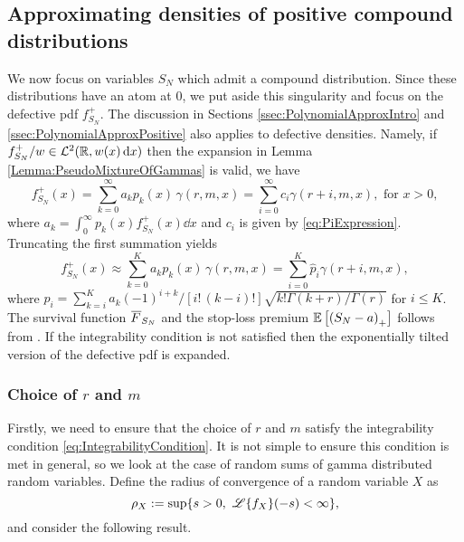 \subsection{Approximating densities of positive compound distributions}
We now focus on variables $S_N$ which admit a compound distribution. Since these distributions have an atom at 0, we put aside this singularity and focus on the defective pdf $f_{S_N}^+$. The discussion in Sections \ref{ssec:PolynomialApproxIntro} and \ref{ssec:PolynomialApproxPositive} also applies to defective densities. Namely, if $f_{S_N}^{+}/w\in \mathcal{L}^2(\mathbb{R}, w(x) \mathop{}\!\mathrm{d} x)$ then the expansion in Lemma \ref{Lemma:PseudoMixtureOfGammas} is valid, we have
\begin{equation*}\label{eq:PseudoErlangMixtureRepresentationDefectivePDF}
f_{S_N}^+(x)= \sum_{k=0}^\infty a_k p_k(x) \, \gamma(r, m, x) = \sum_{i=0}^{\infty} c_i \gamma(r+i,m,x),\text{ for }x>0,
\end{equation*}
where $a_k=\int_{0}^{\infty}p_{k}(x)f_{S_N}^+(x)\dd x$ and $c_i$ is given by \eqref{eq:PiExpression}.
Truncating the first summation yields
\begin{equation*}\label{eq:ApproxPolynomialRepresentation}
f_{S_N}^{+}(x)
\approx \sum_{k=0}^{K} a_k p_{k}(x) \, \gamma(r,m,x)
= \sum_{i=0}^{K} \widehat{p}_i\gamma(r+i,m,x),
\end{equation*}
where $\widehat{p}_i =\sum_{k=i}^K a_k (-1)^{i+k} / [i! \, (k-i)! ] \sqrt{k! \Gamma(k+r) / \Gamma(r)}$ for $i \le K$. The survival function $\Ftail_{S_N}$ and the stop-loss premium $\operatorname{{\mathbb E}}\left[\left(S_N-a\right)_{+}\right]$ follows from . If the integrability condition is not satisfied then the exponentially tilted version of the defective pdf is expanded.

\subsubsection{Choice of $r$ and $m$}\label{ssec:ChoosingmAndr}

Firstly, we need to ensure that the choice of $r$ and $m$ satisfy the integrability condition \eqref{eq:IntegrabilityCondition}. It is not simple to ensure this condition is met in general, so we look at the case of random sums of gamma distributed random variables. Define the radius of convergence of a random variable $X$ as
$$
\rho_X := \sup\{s>0, ~ \mathscr{L}\{f_{X}\}(-s)<\infty\},
$$
and consider the following result.

